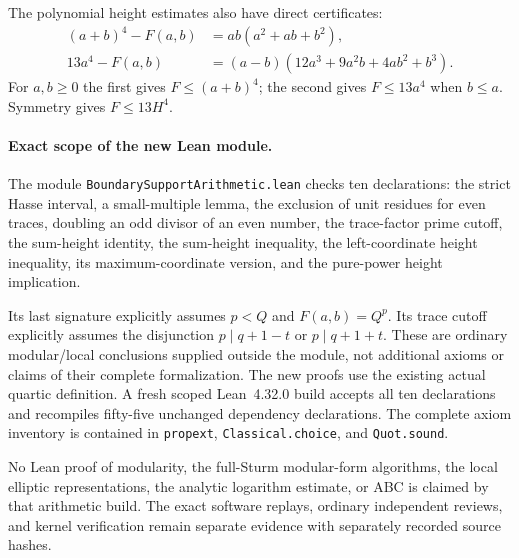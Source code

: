 The polynomial height estimates also have direct certificates:
\begin{align*}
 (a+b)^4-F(a,b)&=ab(a^2+ab+b^2),\\
 13a^4-F(a,b)&=(a-b)(12a^3+9a^2b+4ab^2+b^3).
\end{align*}
For $a,b\ge0$ the first gives $F\le(a+b)^4$; the second gives
$F\le13a^4$ when $b\le a$. Symmetry gives $F\le13H^4$.

\paragraph{Exact scope of the new Lean module.}
The module \texttt{BoundarySupportArithmetic.lean} checks ten
declarations: the strict Hasse interval, a small-multiple lemma,
the exclusion of unit residues for even traces, doubling an odd
divisor of an even number, the trace-factor prime cutoff, the
sum-height identity, the sum-height inequality, the left-coordinate
height inequality, its maximum-coordinate version, and the
pure-power height implication.

Its last signature explicitly assumes $p<Q$ and
$F(a,b)=Q^p$. Its trace cutoff explicitly assumes the disjunction
$p\mid q+1-t$ or $p\mid q+1+t$. These are ordinary modular/local
conclusions supplied outside the module, not additional axioms or
claims of their complete formalization. The new proofs use the
existing actual quartic definition. A fresh scoped Lean~4.32.0
build accepts all ten declarations and recompiles fifty-five
unchanged dependency declarations. The complete axiom inventory is
contained in \texttt{propext}, \texttt{Classical.choice}, and
\texttt{Quot.sound}.

No Lean proof of modularity, the full-Sturm modular-form algorithms,
the local elliptic representations, the analytic logarithm estimate,
or ABC is claimed by that arithmetic build. The exact software
replays, ordinary independent reviews, and kernel verification remain
separate evidence with separately recorded source hashes.

